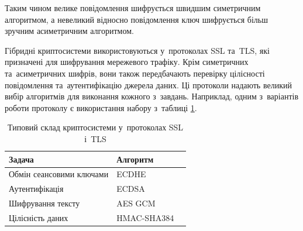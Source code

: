 \documentclass[a4paper,oneside,titlepage,14pt]{extarticle}
\begin{document}
			Таким чином велике повідомлення шифрується швидшим симетричним алгоритмом, а невеликий відносно повідомлення ключ шифрується більш зручним асиметричним алгоритмом.\par
				
			Гібридні криптосистеми використовуються у~протоколах SSL та~TLS, які призначені для шифрування мережевого трафіку. Крім симетричних та~асиметричних шифрів, вони також передбачають перевірку цілісності повідомлення та~аутентифікацію джерела даних. Ці протоколи надають великий вибір алгоритмів для виконання кожного з~завдань. Наприклад, одним з~варіантів роботи протоколу є використання набору з~таблиці \ref{tab:ciphersuite}.
			\begin{table}[h]
				\centering
				\begin{tabular}{lll}
					\toprule
					Задача & Алгоритм \\
					\midrule
					Обмін сеансовими ключами & ECDHE\\
					Аутентифікація & ECDSA \\
					Шифрування тексту & AES GCM \\
					Цілісність даних & HMAC-SHA384 \\
					\bottomrule
				\end{tabular}
				\caption{Типовий склад криптосистеми у~протоколах SSL і~TLS}
				\label{tab:ciphersuite}
			\end{table}
\end{document}
